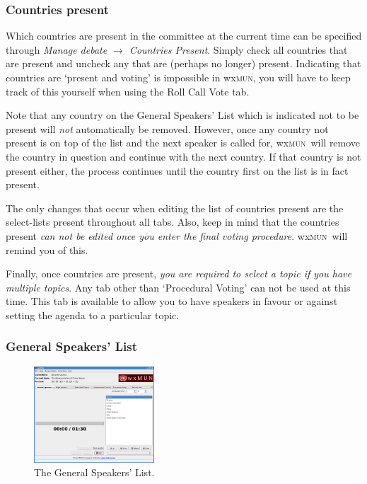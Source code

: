 \documentclass[11pt, a4paper]{article}
\newcommand\wxMUN{wx\textsc{mun}}
\begin{document}
\subsubsection{Countries present}

Which countries are present in the committee at the current time can be specified through \emph{Manage debate $\rightarrow$ Countries Present}. Simply check all countries that are present and uncheck any that are (perhaps no longer) present. Indicating that countries are `present and voting' is impossible in \wxMUN , you will have to keep track of this yourself when using the Roll Call Vote tab.

Note that any country on the General Speakers' List which is indicated not to be present will \emph{not} automatically be removed. However, once any country not present is on top of the list and the next speaker is called for, \wxMUN\ will remove the country in question and continue with the next country. If that country is not present either, the process continues until the country first on the list is in fact present.

The only changes that occur when editing the list of countries present are the select-lists present throughout all tabs. Also, keep in mind that the countries present \emph{can not be edited once you enter the final voting procedure}. \wxMUN\ will remind you of this.

Finally, once countries are present, \emph{you are required to select a topic if you have multiple topics}. Any tab other than `Procedural Voting' can not be used at this time. This tab is available to allow you to have speakers in favour or against setting the agenda to a particular topic.

\subsubsection{General Speakers' List}
\begin{figure}
\includegraphics[width=0.40\textwidth]{screenshots/gsl.png}
\caption{The General Speakers' List.}
\end{figure}
\end{document}

